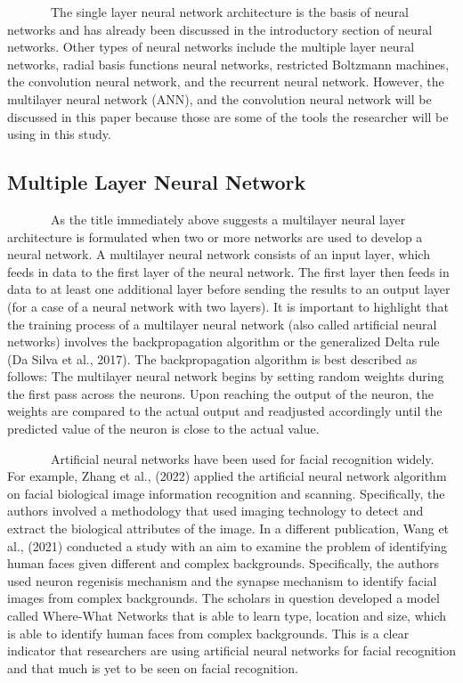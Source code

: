 \documentclass[
  12pt,
]{report}
\begin{document}
~~~~~~~The single layer neural network architecture is the basis of
neural networks and has already been discussed in the introductory
section of neural networks. Other types of neural networks include the
multiple layer neural networks, radial basis functions neural networks,
restricted Boltzmann machines, the convolution neural network, and the
recurrent neural network. However, the multilayer neural network (ANN),
and the convolution neural network will be discussed in this paper
because those are some of the tools the researcher will be using in this
study.

\subsection{Multiple Layer Neural
Network}\label{multiple-layer-neural-network}

~~~~~~~As the title immediately above suggests a multilayer neural layer
architecture is formulated when two or more networks are used to develop
a neural network. A multilayer neural network consists of an input
layer, which feeds in data to the first layer of the neural network. The
first layer then feeds in data to at least one additional layer before
sending the results to an output layer (for a case of a neural network
with two layers). It is important to highlight that the training process
of a multilayer neural network (also called artificial neural networks)
involves the backpropagation algorithm or the generalized Delta rule (Da
Silva et al., 2017). The backpropagation algorithm is best described as
follows: The multilayer neural network begins by setting random weights
during the first pass across the neurons. Upon reaching the output of
the neuron, the weights are compared to the actual output and readjusted
accordingly until the predicted value of the neuron is close to the
actual value.

~~~~~~~Artificial neural networks have been used for facial recognition
widely. For example, Zhang et al., (2022) applied the artificial neural
network algorithm on facial biological image information recognition and
scanning. Specifically, the authors involved a methodology that used
imaging technology to detect and extract the biological attributes of
the image. In a different publication, Wang et al., (2021) conducted a
study with an aim to examine the problem of identifying human faces
given different and complex backgrounds. Specifically, the authors used
neuron regenisis mechanism and the synapse mechanism to identify facial
images from complex backgrounds. The scholars in question developed a
model called Where-What Networks that is able to learn type, location
and size, which is able to identify human faces from complex
backgrounds. This is a clear indicator that researchers are using
artificial neural networks for facial recognition and that much is yet
to be seen on facial recognition.
\end{document}
